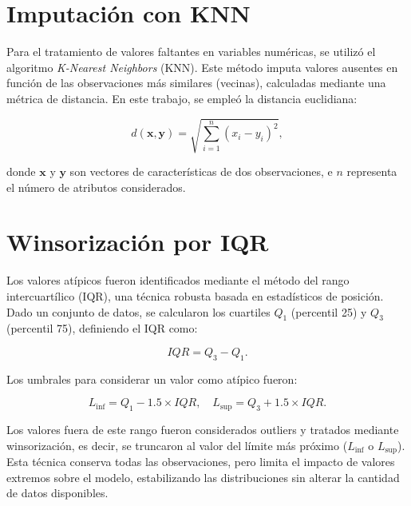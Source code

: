 \section{Imputación con KNN}
\label{subsec:knn}

Para el tratamiento de valores faltantes en variables numéricas, se utilizó el algoritmo \textit{K-Nearest Neighbors} (KNN). Este método imputa valores ausentes en función de las observaciones más similares (vecinas), calculadas mediante una métrica de distancia. En este trabajo, se empleó la distancia euclidiana:

\begin{equation}
d(\mathbf{x}, \mathbf{y}) = \sqrt{\sum_{i=1}^{n} (x_i - y_i)^2},
\end{equation}

donde \(\mathbf{x}\) y \(\mathbf{y}\) son vectores de características de dos observaciones, e \(n\) representa el número de atributos considerados. 



\section{Winsorización por IQR}
\label{subsec:iqr}



Los valores atípicos fueron identificados mediante el método del rango intercuartílico (IQR), una técnica robusta basada en estadísticos de posición. Dado un conjunto de datos, se calcularon los cuartiles \(Q_1\) (percentil 25) y \(Q_3\) (percentil 75), definiendo el IQR como:

\begin{equation}
IQR = Q_3 - Q_1.
\end{equation}

Los umbrales para considerar un valor como atípico fueron:

\begin{equation}
L_{\text{inf}} = Q_1 - 1.5 \times IQR, \quad L_{\text{sup}} = Q_3 + 1.5 \times IQR.
\end{equation}

Los valores fuera de este rango fueron considerados outliers y tratados mediante winsorización, es decir, se truncaron al valor del límite más próximo (\(L_{\text{inf}}\) o \(L_{\text{sup}}\)). Esta técnica conserva todas las observaciones, pero limita el impacto de valores extremos sobre el modelo, estabilizando las distribuciones sin alterar la cantidad de datos disponibles.

